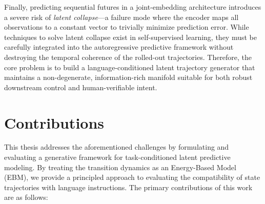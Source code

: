 Finally, predicting sequential futures in a joint-embedding architecture introduces a severe risk of \textit{latent collapse}—a failure mode where the encoder maps all observations to a constant vector to trivially minimize prediction error. While techniques to solve latent collapse exist in self-supervised learning, they must be carefully integrated into the autoregressive predictive framework without destroying the temporal coherence of the rolled-out trajectories. Therefore, the core problem is to build a language-conditioned latent trajectory generator that maintains a non-degenerate, information-rich manifold suitable for both robust downstream control and human-verifiable intent.

\section{Contributions}
\label{intro_contribution}

This thesis addresses the aforementioned challenges by formulating and evaluating a generative framework for task-conditioned latent predictive modeling. By treating the transition dynamics as an Energy-Based Model (EBM), we provide a principled approach to evaluating the compatibility of state trajectories with language instructions. The primary contributions of this work are as follows:


